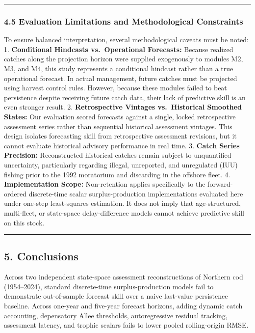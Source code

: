 \documentclass[11pt]{article}
\begin{document}
\begin{center}\rule{0.5\linewidth}{0.5pt}\end{center}

\subsubsection{4.5 Evaluation Limitations and Methodological
Constraints}\label{evaluation-limitations-and-methodological-constraints}

To ensure balanced interpretation, several methodological caveats must
be noted: 1. \textbf{Conditional Hindcasts vs.~Operational Forecasts:}
Because realized catches along the projection horizon were supplied
exogenously to modules M2, M3, and M4, this study represents a
conditional hindcast rather than a true operational forecast. In actual
management, future catches must be projected using harvest control
rules. However, because these modules failed to beat persistence despite
receiving future catch data, their lack of predictive skill is an even
stronger result. 2. \textbf{Retrospective Vintages vs.~Historical
Smoothed States:} Our evaluation scored forecasts against a single,
locked retrospective assessment series rather than sequential historical
assessment vintages. This design isolates forecasting skill from
retrospective assessment revisions, but it cannot evaluate historical
advisory performance in real time. 3. \textbf{Catch Series Precision:}
Reconstructed historical catches remain subject to unquantified
uncertainty, particularly regarding illegal, unreported, and unregulated
(IUU) fishing prior to the 1992 moratorium and discarding in the
offshore fleet. 4. \textbf{Implementation Scope:} Non-retention applies
specifically to the forward-ordered discrete-time scalar
surplus-production implementations evaluated here under one-step
least-squares estimation. It does not imply that age-structured,
multi-fleet, or state-space delay-difference models cannot achieve
predictive skill on this stock.

\begin{center}\rule{0.5\linewidth}{0.5pt}\end{center}

\subsection{5. Conclusions}\label{conclusions}

Across two independent state-space assessment reconstructions of
Northern cod (1954--2024), standard discrete-time surplus-production
models fail to demonstrate out-of-sample forecast skill over a naive
last-value persistence baseline. Across one-year and five-year forecast
horizons, adding dynamic catch accounting, depensatory Allee thresholds,
autoregressive residual tracking, assessment latency, and trophic
scalars fails to lower pooled rolling-origin RMSE.
\end{document}
